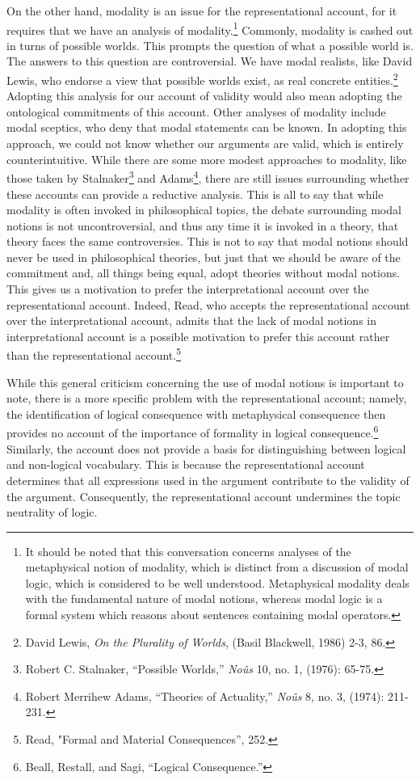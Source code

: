 On the other hand, modality is an issue for the representational
account, for it requires that we have an analysis of
modality.\footnote{It should be noted that this conversation concerns
  analyses of the metaphysical notion of modality, which is distinct
  from a discussion of modal logic, which is considered to be well
  understood. Metaphysical modality deals with the fundamental nature of
  modal notions, whereas modal logic is a formal system which reasons
  about sentences containing modal operators.} Commonly, modality is
cashed out in turns of possible worlds. This prompts the question of
what a possible world is. The answers to this question are
controversial. We have modal realists, like David Lewis, who endorse a
view that possible worlds exist, as real concrete entities.\footnote{David
  Lewis, \emph{On the Plurality of Worlds}, (Basil Blackwell, 1986) 2-3,
  86.} Adopting this analysis for our account of validity would also
mean adopting the ontological commitments of this account. Other
analyses of modality include modal sceptics, who deny that modal
statements can be known. In adopting this approach, we could not know
whether our arguments are valid, which is entirely counterintuitive.
While there are some more modest approaches to modality, like those
taken by Stalnaker\footnote{Robert C. Stalnaker, ``Possible Worlds,''
  \emph{Noûs} 10, no. 1, (1976): 65-75.} and Adams\footnote{Robert
  Merrihew Adams, ``Theories of Actuality,'' \emph{Noûs} 8, no. 3,
  (1974): 211-231.}, there are still issues surrounding whether these
accounts can provide a reductive analysis. This is all to say that while
modality is often invoked in philosophical topics, the debate
surrounding modal notions is not uncontroversial, and thus any time it
is invoked in a theory, that theory faces the same controversies. This
is not to say that modal notions should never be used in philosophical
theories, but just that we should be aware of the commitment and, all
things being equal, adopt theories without modal notions. This gives us
a motivation to prefer the interpretational account over the
representational account. Indeed, Read, who accepts the representational
account over the interpretational account, admits that the lack of modal
notions in interpretational account is a possible motivation to prefer
this account rather than the representational account.\footnote{Read,
  "Formal and Material Consequences'', 252.}

While this general criticism concerning the use of modal notions is
important to note, there is a more specific problem with the
representational account; namely, the identification of logical
consequence with metaphysical consequence then provides no account of
the importance of formality in logical consequence.\footnote{Beall,
  Restall, and Sagi, ``Logical Consequence.''} Similarly, the account
does not provide a basis for distinguishing between logical and
non-logical vocabulary. This is because the representational account
determines that all expressions used in the argument contribute to the
validity of the argument. Consequently, the representational account
undermines the topic neutrality of logic.

